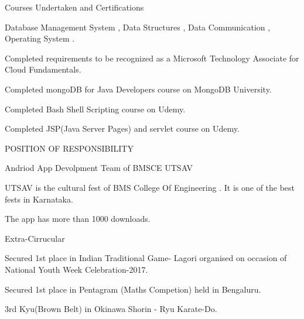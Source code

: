 \documentclass{resume} %
\begin{document}

\begin{rSection}{Courses Undertaken and Certifications}
\begin{rSubsection}{}{}{}{}
\item Database Management System , Data Structures , Data Communication , Operating System .
\item Completed requirements to be recognized as a Microsoft Technology Associate for Cloud Fundamentals.
\item Completed mongoDB for Java Developers course on MongoDB University.
\item Completed Bash Shell Scripting course on Udemy.
\item Completed JSP(Java Server Pages) and servlet course on Udemy. 
\end{rSubsection}
\end{rSection}




\begin{rSection}{POSITION OF RESPONSIBILITY}

\begin{rSubsection}{Andriod App Devolpment Team of BMSCE UTSAV }{}{}{}
\item UTSAV is the cultural fest of BMS College Of Engineering .  It is one of the best fests in Karnataka.
\item The app has more than 1000 downloads.
\end{rSubsection}

\end{rSection}

\begin{rSection}{Extra-Cirrucular} \itemsep -3pt
\begin{rSubsection}{}{}{}{}
\item Secured 1st place in Indian Traditional Game- Lagori organised on occasion of National Youth Week Celebration-2017.
\item Secured 1st place in Pentagram (Maths Competion) held in Bengaluru.
\item 3rd Kyu(Brown Belt) in Okinawa Shorin - Ryu Karate-Do.
\end{rSubsection}
\end{rSection}
\end{document}
